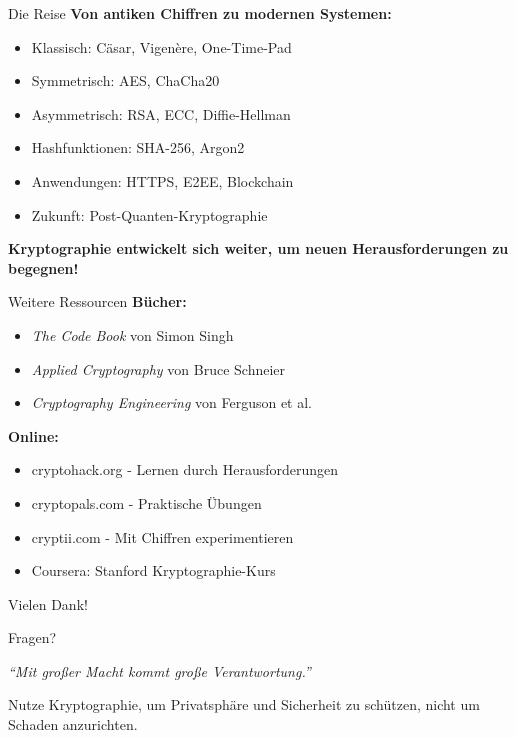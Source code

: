 \documentclass[handout]{beamer}
\begin{document}
\begin{frame}{Die Reise}
\textbf{Von antiken Chiffren zu modernen Systemen:}

\begin{itemize}
    \item Klassisch: Cäsar, Vigenère, One-Time-Pad
    \item Symmetrisch: AES, ChaCha20
    \item Asymmetrisch: RSA, ECC, Diffie-Hellman
    \item Hashfunktionen: SHA-256, Argon2
    \item Anwendungen: HTTPS, E2EE, Blockchain
    \item Zukunft: Post-Quanten-Kryptographie
\end{itemize}

\vspace{0.5cm}
\textbf{Kryptographie entwickelt sich weiter, um neuen Herausforderungen zu begegnen!}
\end{frame}

\begin{frame}{Weitere Ressourcen}
\textbf{Bücher:}
\begin{itemize}
    \item \emph{The Code Book} von Simon Singh
    \item \emph{Applied Cryptography} von Bruce Schneier
    \item \emph{Cryptography Engineering} von Ferguson et al.
\end{itemize}

\vspace{0.3cm}
\textbf{Online:}
\begin{itemize}
    \item cryptohack.org - Lernen durch Herausforderungen
    \item cryptopals.com - Praktische Übungen
    \item cryptii.com - Mit Chiffren experimentieren
    \item Coursera: Stanford Kryptographie-Kurs
\end{itemize}
\end{frame}

\begin{frame}
\begin{center}
\Huge Vielen Dank!

\vspace{1cm}
\large Fragen?

\vspace{1cm}
\normalsize
\textit{``Mit großer Macht kommt große Verantwortung.''}

\vspace{0.5cm}
Nutze Kryptographie, um Privatsphäre und Sicherheit zu schützen, nicht um Schaden anzurichten.
\end{center}
\end{frame}
\end{document}
